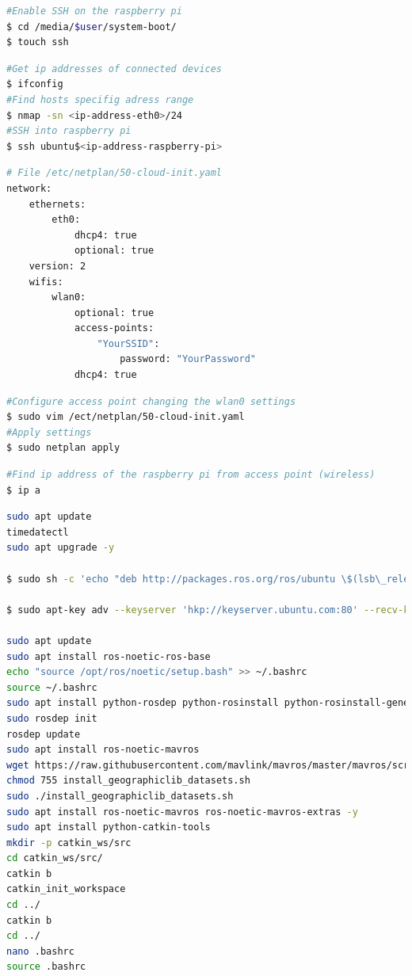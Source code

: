 \documentclass[../Head/report.tex]{subfiles}
\begin{document}
\lstset{style=mystyle}



\begin{lstlisting}[language=Bash,frame=none]
#Enable SSH on the raspberry pi
$ cd /media/$user/system-boot/
$ touch ssh
\end{lstlisting}


\begin{lstlisting}[language=Bash,frame=none]
#Get ip addresses of connected devices 
$ ifconfig	
#Find hosts specifig adress range 
$ nmap -sn <ip-address-eth0>/24
#SSH into raspberry pi 
$ ssh ubuntu$<ip-address-raspberry-pi>
\end{lstlisting}

\begin{lstlisting}[language=Bash,frame=none]
# File /etc/netplan/50-cloud-init.yaml
network:
    ethernets:
        eth0:
            dhcp4: true
            optional: true
    version: 2
    wifis:
        wlan0:
            optional: true
            access-points:
                "YourSSID":
                    password: "YourPassword"
            dhcp4: true

\end{lstlisting}

\begin{lstlisting}[language=Bash,frame=none]
#Configure access point changing the wlan0 settings
$ sudo vim /ect/netplan/50-cloud-init.yaml
#Apply settings  
$ sudo netplan apply
\end{lstlisting}

\begin{lstlisting}[language=Bash,frame=none]
#Find ip address of the raspberry pi from access point (wireless)
$ ip a
\end{lstlisting}

\begin{lstlisting}[language=Bash,frame=none]
sudo apt update
timedatectl 
sudo apt upgrade -y

$ sudo sh -c 'echo "deb http://packages.ros.org/ros/ubuntu \$(lsb\_release sc) main" > /etc/apt/sources.list.d/ros-latest.list'

$ sudo apt-key adv --keyserver 'hkp://keyserver.ubuntu.com:80' --recv-key C1CF6E31E6BADE8868B172B4F42ED6FBAB17C654

sudo apt update
sudo apt install ros-noetic-ros-base
echo "source /opt/ros/noetic/setup.bash" >> ~/.bashrc
source ~/.bashrc
sudo apt install python-rosdep python-rosinstall python-rosinstall-generator python-wstool build-essential python-rosdep
sudo rosdep init
rosdep update
sudo apt install ros-noetic-mavros
wget https://raw.githubusercontent.com/mavlink/mavros/master/mavros/scripts/install_geographiclib_datasets.sh
chmod 755 install_geographiclib_datasets.sh
sudo ./install_geographiclib_datasets.sh
sudo apt install ros-noetic-mavros ros-noetic-mavros-extras -y
sudo apt install python-catkin-tools 
mkdir -p catkin_ws/src
cd catkin_ws/src/
catkin b
catkin_init_workspace 
cd ../
catkin b
cd ../
nano .bashrc 
source .bashrc
\end{lstlisting}
\end{document}
